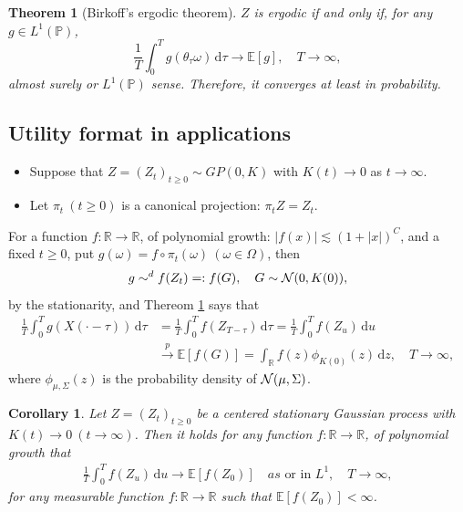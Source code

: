 \documentclass[a4paper,10pt,twoside]{article}
\newtheorem{thm}{Theorem}[section]
\newtheorem{cor}{Corollary}[section]
\numberwithin{equation}{section}
\def\R{\mathbb{R}}
\def\th{\theta}
\def\P{{\mathbb{P}}}
\def\toP{\stackrel{p}{\longrightarrow}}
\def\E{\mathbb{E}}
\def\df{\mathrm{d}}
\newcommand{\bi}{\begin{itemize}}
\newcommand{\ei}{\end{itemize}}
\begin{document}
\begin{thm}[Birkoff's ergodic theorem] \label{thm:birkoff}
 $Z$ is ergodic if and only if, for any $g\in L^1(\P)$,
\[
\frac{1}{T}\int_0^T g(\th_\tau \omega)\,\df \tau \to \E[g],\quad T\to \infty, 
\]
almost surely or $L^1(\P)$ sense. Therefore, it converges at least in probability.
\end{thm}

\subsection{Utility format in applications}

\bi
\item Suppose that $Z = (Z_t)_{t\ge 0}\sim GP(0,K)$ with $K(t) \to 0$ as $t\to \infty$.
\item Let $\pi_t\ (t\ge 0)$ is a canonical projection: $\pi_t Z = Z_t$.
\ei

For a function $f:\R\to \R$, of polynomial growth: $|f(x)| \lesssim (1 + |x|)^C$, and a fixed $t\ge 0$,
put $g(\omega) = f\circ \pi_t (\omega)\ (\omega \in \Omega)$, then
\[
g \sim^d f(Z_t) =:f(G),\quad G\sim {\cal N}(0,K(0)), 
\]
by the stationarity, and Thereom \ref{thm:birkoff} says that
\begin{align*}
\frac{1}{T} \int_0^T g(X(\cdot - \tau))\,\df \tau &= \frac{1}{T} \int_0^T f(Z_{T-\tau}) \,\df \tau = \frac{1}{T} \int_0^T f(Z_u) \,\df u \\
&\toP \E[f(G)] = \int_\R f(z) \phi_{K(0)}(z)\,\df z,\quad T\to \infty,
\end{align*}
where $\phi_{\mu, \Sigma}(z)$ is the probability density of ${\cal N}(\mu,\Sigma)$.

\begin{cor}\label{cor:ergodic}
Let $Z = (Z_t)_{t\ge 0}$ be a centered stationary Gaussian process  with $K(t) \to 0\ (t\to \infty)$.
Then it holds for any function $f:\R\to \R$, of polynomial growth that
\begin{align*}
 \frac{1}{T} \int_0^T f(Z_u) \,\df u \to \E[f(Z_0)]\quad \mbox{$as$ or in $L^1$}, \quad T\to \infty,  %
\end{align*}
for any measurable function $f:\R\to \R$ such that $\E[f(Z_0)]<\infty$.  
\end{cor}
\end{document}
